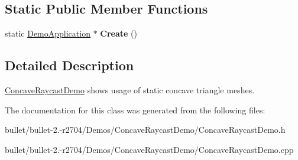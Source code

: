 \subsection*{Static Public Member Functions}
\begin{DoxyCompactItemize}
\item 
\hypertarget{class_concave_raycast_demo_aac7ddce71eaf020bae62685e6863aa07}{static \hyperlink{class_demo_application}{Demo\+Application} $\ast$ {\bfseries Create} ()}\label{class_concave_raycast_demo_aac7ddce71eaf020bae62685e6863aa07}

\end{DoxyCompactItemize}


\subsection{Detailed Description}
\hyperlink{class_concave_raycast_demo}{Concave\+Raycast\+Demo} shows usage of static concave triangle meshes. 

The documentation for this class was generated from the following files\+:\begin{DoxyCompactItemize}
\item 
bullet/bullet-\/2.-\/r2704/\+Demos/\+Concave\+Raycast\+Demo/Concave\+Raycast\+Demo.\+h\item 
bullet/bullet-\/2.-\/r2704/\+Demos/\+Concave\+Raycast\+Demo/Concave\+Raycast\+Demo.\+cpp\end{DoxyCompactItemize}
